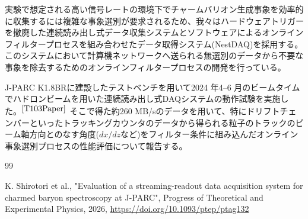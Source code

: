 \documentclass[12pt,a4paper,upLaTeX]{jsarticle}
\begin{document}
実験で想定される高い信号レートの環境下でチャームバリオン生成事象を効率的に収集するには複雑な事象選別が要求されるため、我々はハードウェアトリガーを撤廃した連続読み出し式データ収集システムとソフトウェアによるオンラインフィルタープロセスを組み合わせたデータ取得システム(NestDAQ)を採用する。
このシステムにおいて計算機ネットワークへ送られる無選別のデータから不要な事象を除去するためのオンラインフィルタープロセスの開発を行っている。

J-PARC K1.8BRに建設したテストベンチを用いて2024 年4--6 月のビームタイムでハドロンビームを用いた連続読み出し式DAQシステムの動作試験を実施した。$^{\cite{T103Paper}}$
そこで得た約260 MB/sのデータを用いて、特にドリフトチェンバーといったトラッキングカウンタのデータから得られる粒子のトラックのビーム軸方向とのなす角度($dx/dz$など)をフィルター条件に組み込んだオンライン事象選別プロセスの性能評価について報告する。

\renewcommand{\refname}{}
\begin{thebibliography}{99}
\vspace{-30pt}

 K. Shirotori et al., "Evaluation of a streaming-readout data acquisition system for charmed baryon spectroscopy at J-PARC", Progress of Theoretical and Experimental Physics, 2026, \url{https://doi.org/10.1093/ptep/ptag132}

\end{thebibliography}
\end{document}
